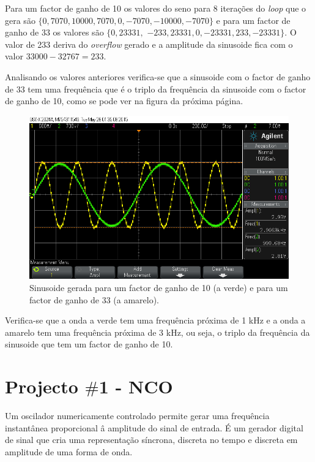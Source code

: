 \documentclass[11pt]{article}
\numberwithin{equation}{section}
\begin{document}
Para um factor de ganho de 10 os valores do seno para 8 iterações do \textit{loop} que o gera são $\{0,7070,10000,7070,0,-7070,-10000,-7070\}$ e para um factor de ganho de 33 os valores são $\{0,23331,$ \linebreak $-233,23331,0,-23331,233,-23331\}$. O valor de 233 deriva do \textit{overflow} gerado e a amplitude da sinusoide fica com o valor $33000 - 32767 = 233$.

Analisando os valores anteriores verifica-se que a sinusoide com o factor de ganho de 33 tem uma frequência que é o triplo da frequência da sinusoide com o factor de ganho de 10, como se pode ver na figura da próxima página.

\begin{figure}[H]
	\centering
	\includegraphics[keepaspectratio=true, scale=0.37]{exps/demonstracao}
	\caption{Sinusoide gerada para um factor de ganho de 10 (a verde) e para um factor de ganho de 33 (a amarelo).}
	\vspace{-0.8em}
\end{figure}

Verifica-se que a onda a verde tem uma frequência próxima de 1 kHz e a onda a amarelo tem uma frequência próxima de 3 kHz, ou seja, o triplo da frequência da sinusoide que tem um factor de ganho de 10.

\pagebreak

\section{Projecto $\#$1 - NCO}

Um oscilador numericamente controlado permite gerar uma frequência instantânea proporcional â amplitude do sinal de entrada. É um gerador digital de sinal que cria uma representação síncrona, discreta no tempo e discreta em amplitude de uma forma de onda.
\end{document}

